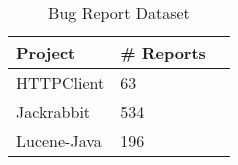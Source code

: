 
\begin{table}
\caption{Bug Report Dataset}\label{tab:reports}
\begin{tabular}{|l|l|l}
\hline
{\bf Project} & {\bf \# Reports} \\
\hline HTTPClient & 63\\
\hline Jackrabbit & 534\\
\hline Lucene-Java & 196\\
\hline
\end{tabular}
\end{table}




